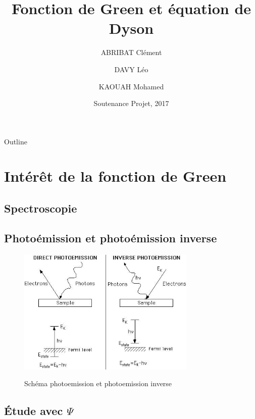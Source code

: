 \documentclass{beamer}
\title{Fonction de Green et \'equation de Dyson}
\author{ABRIBAT Cl\'ement \and DAVY L\'eo \and KAOUAH Mohamed}
\institute[Universities of Somewhere and Elsewhere] %
{
  
  L1 Parcours sp\'ecial}
\date{Soutenance Projet, 2017}
\begin{document}
\begin{frame}
  \titlepage 
\end{frame}

\begin{frame}{Outline}
  \tableofcontents
\end{frame}

\section{Int\'er\^et de la fonction de Green}

\subsection{Spectroscopie}
\begin{frame}
 
\end{frame}
  


\subsection{Photo\'emission et photo\'emission inverse}
\begin{frame}
 \begin{figure}
\caption{Sch\'ema photoemission et photoemission inverse}
\includegraphics[width = 85mm]{photoem.jpg}
\label{solb}
\end{figure}
\end{frame}


\subsection{\'Etude avec $\Psi$}
\end{document}
